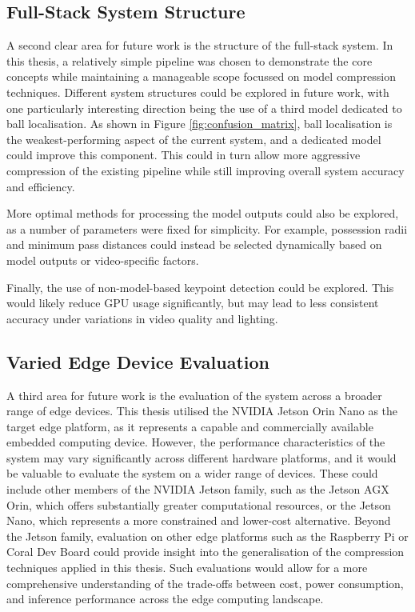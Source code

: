 \subsection{Full-Stack System Structure}
A second clear area for future work is the structure of the full-stack system. In this thesis, a relatively simple pipeline was chosen to demonstrate the core concepts while maintaining a manageable scope focussed on model compression techniques. Different system structures could be explored in future work, with one particularly interesting direction being the use of a third model dedicated to ball localisation. As shown in Figure \ref{fig:confusion_matrix}, ball localisation is the weakest-performing aspect of the current system, and a dedicated model could improve this component. This could in turn allow more aggressive compression of the existing pipeline while still improving overall system accuracy and efficiency.

More optimal methods for processing the model outputs could also be explored, as a number of parameters were fixed for simplicity. For example, possession radii and minimum pass distances could instead be selected dynamically based on model outputs or video-specific factors.

Finally, the use of non-model-based keypoint detection could be explored. This would likely reduce GPU usage significantly, but may lead to less consistent accuracy under variations in video quality and lighting.


\subsection{Varied Edge Device Evaluation}
A third area for future work is the evaluation of the system across a broader range of edge devices. This thesis utilised the NVIDIA Jetson Orin Nano \cite{JetsonOrinNano} as the target edge platform, as it represents a capable and commercially available embedded computing device. However, the performance characteristics of the system may vary significantly across different hardware platforms, and it would be valuable to evaluate the system on a wider range of devices. These could include other members of the NVIDIA Jetson family, such as the Jetson AGX Orin, which offers substantially greater computational resources, or the Jetson Nano, which represents a more constrained and lower-cost alternative. Beyond the Jetson family, evaluation on other edge platforms such as the Raspberry Pi or Coral Dev Board could provide insight into the generalisation of the compression techniques applied in this thesis. Such evaluations would allow for a more comprehensive understanding of the trade-offs between cost, power consumption, and inference performance across the edge computing landscape.

